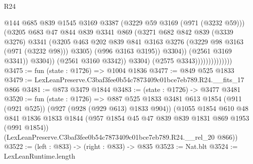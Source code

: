\begin{lexlean}{R24}
\begin{coremodule}
                                          @144
                                          @685
                                          @839
                                          @1545
                                          @3169
                                          @3387
                                          (@3229 @59 @3169 (@971 (@3232 @59)))
                                          (@3205
                                            @683
                                            @47
                                            @844
                                            @839
                                            @3341
                                            @869
                                            (@3271
                                              @682
                                              @842
                                              @839
                                              (@3339 @3276)
                                              @3341
                                              (@3205
                                                @463
                                                @202
                                                @839
                                                @841
                                                @3163
                                                @3276
                                                (@3229 @98 @3163 (@971 (@3232 @98)))
                                                @3305)
                                              (@996 @3163 @3195))
                                            @3304))
                                        (@2561 @3169 @3341))
                                      @3304))
                                  (@2561 @3160 @3342))
                                @3304)
                              (@2575 @3343))))))))))))))
@3475 := fun (state : @1726) => @1004 @1836
@3477 := @849 @525 @1833
@3479 := LexLeanPreserve.C3baf3fee0b54c7873409c01bce7eb789.R24.__fits_17 @866
@3481 := @873 @3479 @1844
@3483 := (state : @1726) -> @3477 @3481
@3520 := fun (state : @1726) =>
  @887
    @525
    @1833
    @3481
    @613
    @1854
    (@911 (@921 @525))
    (@927 (@928 (@929 @613) @1833 @904))
    (@1055
      @1854
      @610
      @48
      @841
      @1836
      @1833
      @1844
      (@957 @1854 @45 @47 @839 @839 @1831 @869 @1953 (@991 @1854))
      (LexLeanPreserve.C3baf3fee0b54c7873409c01bce7eb789.R24.__rel_20 @866))
@3522 := (left : @833) -> (right : @833) -> @835
@3523 := Nat.blt
@3524 := LexLeanRuntime.length

\end{coremodule}
\end{lexlean}
